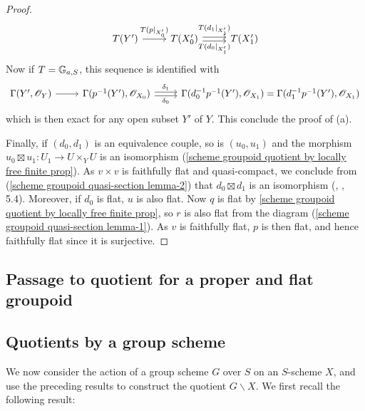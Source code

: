 \begin{proof}
\[\begin{tikzcd}
T(Y')\ar[r,"T(p|_{X_0'})"]&T(X_0')\ar[r,shift left=2pt,"T(d_1|_{X_1'})"]\ar[r,shift right=2pt,swap,"T(d_0|_{X_1'})"]&T(X_1')
\end{tikzcd}\] 
Now if $T=\mathbb{G}_{a,S}$, this sequence is identified with
\[\begin{tikzcd}
\Gamma(Y',\mathscr{O}_Y)\ar[r]&\Gamma(p^{-1}(Y'),\mathscr{O}_{X_0})\ar[r,shift left=2pt,"\delta_1"]\ar[r,shift right=2pt,swap,"\delta_0"]&\Gamma(d_0^{-1}p^{-1}(Y'),\mathscr{O}_{X_1})=\Gamma(d_1^{-1}p^{-1}(Y'),\mathscr{O}_{X_1})
\end{tikzcd}\]
which is then exact for any open subset $Y'$ of $Y$. This conclude the proof of (a).\par
Finally, if $(d_0,d_1)$ is an equivalence couple, so is $(u_0,u_1)$ and the morphism $u_0\boxtimes u_1:U_1\to U\times_YU$ is an isomorphism (\cref{scheme groupoid quotient by locally free finite prop}). As $v\times v$ is faithfully flat and quasi-compact, we conclude from (\ref{scheme groupoid quasi-section lemma-2}) that $d_0\boxtimes d_1$ is an isomorphism (\cite{SGA1}, , 5.4). Moreover, if $d_0$ is flat, $u$ is also flat. Now $q$ is flat by \cref{scheme groupoid quotient by locally free finite prop}, so $r$ is also flat from the diagram (\ref{scheme groupoid quasi-section lemma-1}). As $v$ is faithfully flat, $p$ is then flat, and hence faithfully flat since it is surjective.
\end{proof}

\subsection{Passage to quotient for a proper and flat groupoid}

\subsection{Quotients by a group scheme}
We now consider the action of a group scheme $G$ over $S$ on an $S$-scheme $X$, and use the preceding results to construct the quotient $G\backslash X$. We first recall the following result:


